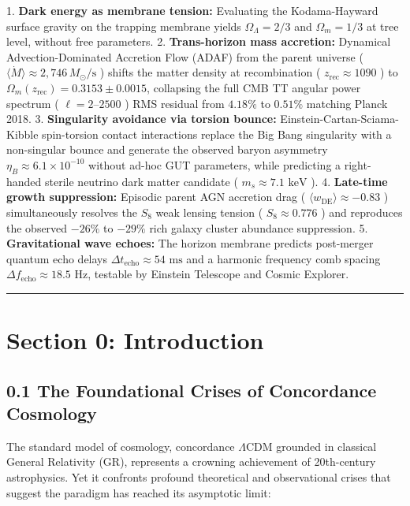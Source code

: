 \documentclass[11pt,a4paper]{article}
\theoremstyle{definition}\newtheorem{definition}{Definition}
\theoremstyle{remark}\newtheorem{remark}{Remark}
\begin{document}
1. \textbf{Dark energy as membrane tension:} Evaluating the Kodama-Hayward surface gravity on the trapping membrane yields $\Omega_\Lambda = 2/3$ and $\Omega_m = 1/3$ at tree level, without free parameters.
2. \textbf{Trans-horizon mass accretion:} Dynamical Advection-Dominated Accretion Flow (ADAF) from the parent universe ( $\langle \dot{M} \rangle \approx 2{,}746 \, M_\odot/\text{s}$ ) shifts the matter density at recombination ( $z_{\text{rec}} \approx 1090$ ) to $\Omega_m(z_{\text{rec}}) = 0.3153 \pm 0.0015$, collapsing the full CMB TT angular power spectrum ( $\ell = 2\text{--}2500$ ) RMS residual from $4.18\%$ to $0.51\%$ matching Planck 2018.
3. \textbf{Singularity avoidance via torsion bounce:} Einstein-Cartan-Sciama-Kibble spin-torsion contact interactions replace the Big Bang singularity with a non-singular bounce and generate the observed baryon asymmetry $\eta_B \approx 6.1 \times 10^{-10}$ without ad-hoc GUT parameters, while predicting a right-handed sterile neutrino dark matter candidate ( $m_s \approx 7.1\text{ keV}$ ).
4. \textbf{Late-time growth suppression:} Episodic parent AGN accretion drag ( $\langle w_{\text{DE}} \rangle \approx -0.83$ ) simultaneously resolves the $S_8$ weak lensing tension ( $S_8 \approx 0.776$ ) and reproduces the observed $-26\%$ to $-29\%$ rich galaxy cluster abundance suppression.
5. \textbf{Gravitational wave echoes:} The horizon membrane predicts post-merger quantum echo delays $\Delta t_{\text{echo}} \approx 54\text{ ms}$ and a harmonic frequency comb spacing $\Delta f_{\text{echo}} \approx 18.5\text{ Hz}$, testable by Einstein Telescope and Cosmic Explorer.

\noindent\rule{\linewidth}{0.4pt}
\section{Section 0: Introduction}
\subsection{0.1 The Foundational Crises of Concordance Cosmology}

The standard model of cosmology, concordance $\Lambda\text{CDM}$ grounded in classical General Relativity (GR), represents a crowning achievement of 20th-century astrophysics. Yet it confronts profound theoretical and observational crises that suggest the paradigm has reached its asymptotic limit:
\end{document}
